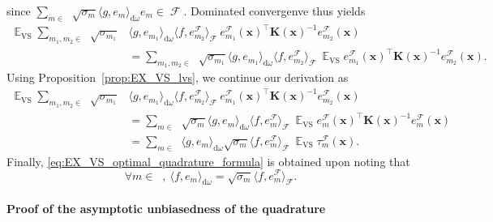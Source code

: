 \documentclass[twoside,11pt]{book}
\numberwithin{theorem}{chapter}
\numberwithin{definition}{chapter}
\numberwithin{proposition}{chapter}
\numberwithin{corollary}{chapter}
\numberwithin{example}{chapter}
\numberwithin{lemma}{chapter}
\DeclareMathOperator{\VS}{\mathrm{VS}}
\DeclareMathOperator{\Tran}{\intercal}
\DeclareMathOperator{\EX}{\mathbb{E}}
\DeclareMathOperator{\F}{\mathcal{F}}
\DeclareMathOperator{\Ns}{\mathbb{N}^{*}}
\begin{document}
since $\sum_{m \in \Ns} \sqrt{\sigma_{m}}\langle g,e_{m} \rangle_{\mathrm{d}\omega} e_{m} \in \F$.
Dominated convergenve thus yields
\begin{align}
\EX_{\VS} \sum\limits_{m_{1},m_{2} \in \Ns} \sqrt{\sigma_{m_{1}}} & \langle g, e_{m_{1}} \rangle_{\mathrm{d}\omega}  \langle f, e_{m_{2}}^{\F} \rangle_{\F} \:e_{m_{1}}^{\F}(\bm{x})^{\Tran} \bm{K}(\bm{x})^{-1}e_{m_{2}}^{\F}(\bm{x}) \\
& = \sum\limits_{m_{1},m_{2} \in \Ns} \sqrt{\sigma_{m_{1}}} \langle g, e_{m_{1}} \rangle_{\mathrm{d}\omega}  \langle f, e_{m_{2}}^{\F} \rangle_{\F} \:\EX_{\VS} e_{m_{1}}^{\F}(\bm{x})^{\Tran} \bm{K}(\bm{x})^{-1}e_{m_{2}}^{\F}(\bm{x}).
\end{align}
Using Proposition~\ref{prop:EX_VS_lvs}, we continue our derivation as
\begin{align}
\EX_{\VS} \sum\limits_{m_{1},m_{2} \in \Ns} \sqrt{\sigma_{m_{1}}} & \langle g, e_{m_{1}} \rangle_{\mathrm{d}\omega}  \langle f, e_{m_{2}}^{\F} \rangle_{\F} \: e_{m_{1}}^{\F}(\bm{x})^{\Tran} \bm{K}(\bm{x})^{-1}e_{m_{2}}^{\F}(\bm{x}) \\
& = \sum\limits_{m \in \Ns} \sqrt{\sigma_{m}} \langle g, e_{m} \rangle_{\mathrm{d}\omega}  \langle f, e_{m}^{\F} \rangle_{\F} \: \EX_{\VS} e_{m}^{\F}(\bm{x})^{\Tran} \bm{K}(\bm{x})^{-1}e_{m}^{\F}(\bm{x})\\
& = \sum\limits_{m \in \Ns}  \langle g, e_{m} \rangle_{\mathrm{d}\omega}  \sqrt{\sigma_{m}}\langle f, e_{m}^{\F} \rangle_{\F} \: \EX_{\VS} \tau_{m}^{\F}(\bm{x}).
\end{align}
Finally, \eqref{eq:EX_VS_optimal_quadrature_formula} is obtained upon noting that
\begin{equation}
\forall m \in \Ns, \: \langle f,e_{m} \rangle_{\mathrm{d}\omega} = \sqrt{\sigma_{m}} \langle f,e_{m}^{\F} \rangle_{\F}.
\end{equation}
\paragraph{Proof of the asymptotic unbiasedness of the quadrature }
\end{document}
